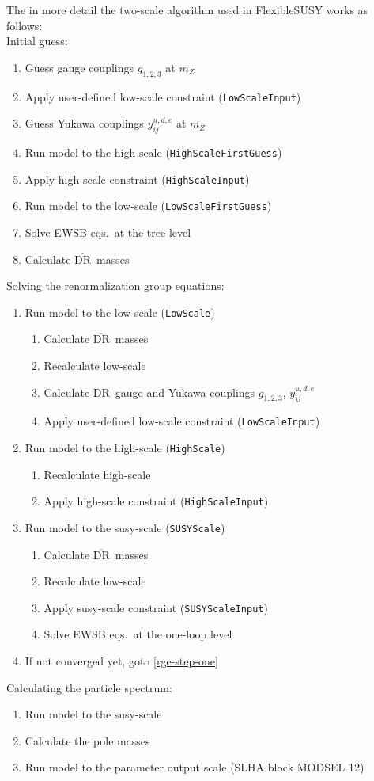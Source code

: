 \documentclass[final,3p,times,pdflatex]{elsarticle}
\newcommand{\fs}{FlexibleSUSY\xspace}
\newcommand{\code}[1]{\lstinline|#1|}  %
\newcommand{\textoverline}[1]{$\overline{\mbox{#1}}$}
\newcommand{\DRbar}{\textoverline{DR}\xspace}
\begin{document}
The in more detail the two-scale algorithm used in \fs works as
follows:
%
\\Initial guess:
\begin{enumerate}
\item Guess gauge couplings $g_{1,2,3}$ at $m_Z$
\item Apply user-defined low-scale constraint (\code{LowScaleInput})
\item Guess Yukawa couplings $y^{u,d,e}_{ij}$ at $m_Z$
\item Run model to the high-scale (\code{HighScaleFirstGuess})
\item Apply high-scale constraint (\code{HighScaleInput})
\item Run model to the low-scale (\code{LowScaleFirstGuess})
\item Solve EWSB eqs.\ at the tree-level
\item Calculate \DRbar\ masses
\end{enumerate}
%
Solving the renormalization group equations:
\begin{enumerate}
\item \label{rge-step-one} Run model to the low-scale (\code{LowScale})
  \begin{enumerate}
  \item Calculate \DRbar\ masses
  \item Recalculate low-scale
  \item Calculate \DRbar\ gauge and Yukawa couplings $g_{1,2,3}$, $y^{u,d,e}_{ij}$
  \item Apply user-defined low-scale constraint (\code{LowScaleInput})
  \end{enumerate}
\item Run model to the high-scale (\code{HighScale})
  \begin{enumerate}
  \item Recalculate high-scale
  \item Apply high-scale constraint (\code{HighScaleInput})
  \end{enumerate}
\item Run model to the susy-scale (\code{SUSYScale})
  \begin{enumerate}
  \item Calculate \DRbar\ masses
  \item Recalculate low-scale
  \item Apply susy-scale constraint (\code{SUSYScaleInput})
  \item Solve EWSB eqs.\ at the one-loop level
  \end{enumerate}
\item If not converged yet, goto \ref{rge-step-one}
\end{enumerate}
%
Calculating the particle spectrum:
\begin{enumerate}
\item Run model to the susy-scale
\item Calculate the pole masses
\item Run model to the parameter output scale (SLHA block MODSEL 12)
\end{enumerate}
\end{document}
